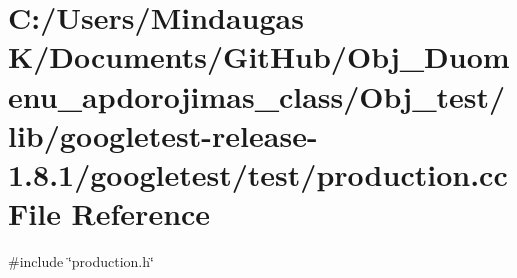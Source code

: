 \hypertarget{_obj__test_2lib_2googletest-release-1_88_81_2googletest_2test_2production_8cc}{}\section{C\+:/\+Users/\+Mindaugas K/\+Documents/\+Git\+Hub/\+Obj\+\_\+\+Duomenu\+\_\+apdorojimas\+\_\+class/\+Obj\+\_\+test/lib/googletest-\/release-\/1.8.1/googletest/test/production.cc File Reference}
\label{_obj__test_2lib_2googletest-release-1_88_81_2googletest_2test_2production_8cc}
{\ttfamily \#include \char`\"{}production.\+h\char`\"{}}\newline
